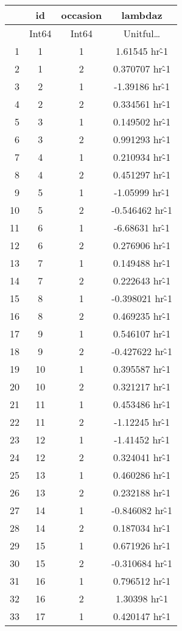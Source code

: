 \documentclass[12pt,a4paper]{article}
\begin{document}
\begin{tabular}{r|ccc}
	& id & occasion & lambdaz\\
	\hline
	& Int64 & Int64 & Unitful…\\
	\hline
	1 & 1 & 1 & 1.61545 hr\^-1 \\
	2 & 1 & 2 & 0.370707 hr\^-1 \\
	3 & 2 & 1 & -1.39186 hr\^-1 \\
	4 & 2 & 2 & 0.334561 hr\^-1 \\
	5 & 3 & 1 & 0.149502 hr\^-1 \\
	6 & 3 & 2 & 0.991293 hr\^-1 \\
	7 & 4 & 1 & 0.210934 hr\^-1 \\
	8 & 4 & 2 & 0.451297 hr\^-1 \\
	9 & 5 & 1 & -1.05999 hr\^-1 \\
	10 & 5 & 2 & -0.546462 hr\^-1 \\
	11 & 6 & 1 & -6.68631 hr\^-1 \\
	12 & 6 & 2 & 0.276906 hr\^-1 \\
	13 & 7 & 1 & 0.149488 hr\^-1 \\
	14 & 7 & 2 & 0.222643 hr\^-1 \\
	15 & 8 & 1 & -0.398021 hr\^-1 \\
	16 & 8 & 2 & 0.469235 hr\^-1 \\
	17 & 9 & 1 & 0.546107 hr\^-1 \\
	18 & 9 & 2 & -0.427622 hr\^-1 \\
	19 & 10 & 1 & 0.395587 hr\^-1 \\
	20 & 10 & 2 & 0.321217 hr\^-1 \\
	21 & 11 & 1 & 0.453486 hr\^-1 \\
	22 & 11 & 2 & -1.12245 hr\^-1 \\
	23 & 12 & 1 & -1.41452 hr\^-1 \\
	24 & 12 & 2 & 0.324041 hr\^-1 \\
	25 & 13 & 1 & 0.460286 hr\^-1 \\
	26 & 13 & 2 & 0.232188 hr\^-1 \\
	27 & 14 & 1 & -0.846082 hr\^-1 \\
	28 & 14 & 2 & 0.187034 hr\^-1 \\
	29 & 15 & 1 & 0.671926 hr\^-1 \\
	30 & 15 & 2 & -0.310684 hr\^-1 \\
	31 & 16 & 1 & 0.796512 hr\^-1 \\
	32 & 16 & 2 & 1.30398 hr\^-1 \\
	33 & 17 & 1 & 0.420147 hr\^-1 \\

\end{tabular}
\end{document}
